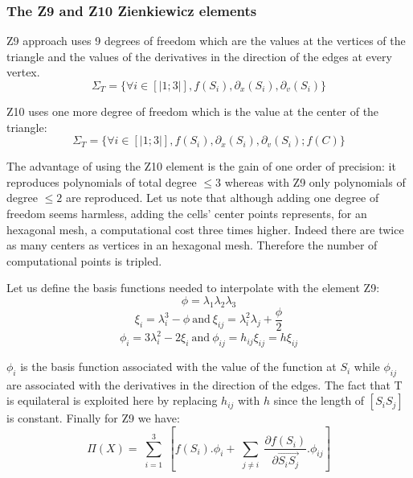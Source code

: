 \documentclass[proc]{edpsmath}
\begin{document}
\subsubsection{The Z9 and Z10 Zienkiewicz elements}
Z9 approach uses 9 degrees of freedom which are the values at the vertices of the triangle and the values of the derivatives in the direction of the edges at every vertex.
\begin{equation*}
 \Sigma_T = \lbrace \forall i \in [|1;3|], f(S_i),\partial_x(S_i),\partial_v(S_i) \rbrace 
\end{equation*}

 \noindent Z10 uses one more degree of freedom which is the value at the center of the triangle:
\begin{equation*}
 \Sigma_T = \lbrace \forall i \in [|1;3|], f(S_i),\partial_x(S_i),\partial_v(S_i); f(C) \rbrace 
\end{equation*}

 \noindent The advantage of using the Z10 element is the gain of one order of precision: it reproduces polynomials of total degree $\leq 3$ whereas with Z9 only polynomials of degree $\leq 2$ are reproduced.
 Let us note that although adding one degree of freedom seems harmless, adding the cells' center points represents, for an hexagonal mesh, a computational cost three times higher. Indeed there are twice as many centers as vertices in an hexagonal mesh. Therefore the number of computational points is tripled. 
 
Let us define the basis functions needed to interpolate with the element Z9: 
\begin{equation*}
\phi = \lambda_1 \lambda_2 \lambda_3 
\end{equation*}
\begin{equation*}
\xi _i= \lambda_i^3 - \phi ~\text{and}~ \xi_{ij}= \lambda_{i}^2 \lambda_j + \frac{\phi}{2} 
\end{equation*}
\begin{equation*}
\phi_i = 3\lambda_{i}^2 -2 \xi_i ~\text{and} ~\phi_{ij} = h_{ij} \xi_{ij}=h \xi_{ij}
\end{equation*}


\noindent $\phi_i$ is the basis function associated with the value of the function at $S_i$ while $\phi_{ij}$ are associated with the derivatives in the direction of the edges.    
The fact that T is equilateral is exploited here by replacing $h_{ij}$ with $h$ since the length of $ [S_iS_j]$ is constant. Finally for Z9 we have:
\begin{equation*}
 \Pi (X) = \sum \limits_{\substack{i=1 }}^{3}{ [f(S_i).\phi_i + \sum \limits_{\substack{j\neq i }}^{}{ \frac{\partial f(S_i)}{\partial  \overrightarrow{ S_i S_j } }.\phi_{ij} } ] } 
\end{equation*}
\end{document}

